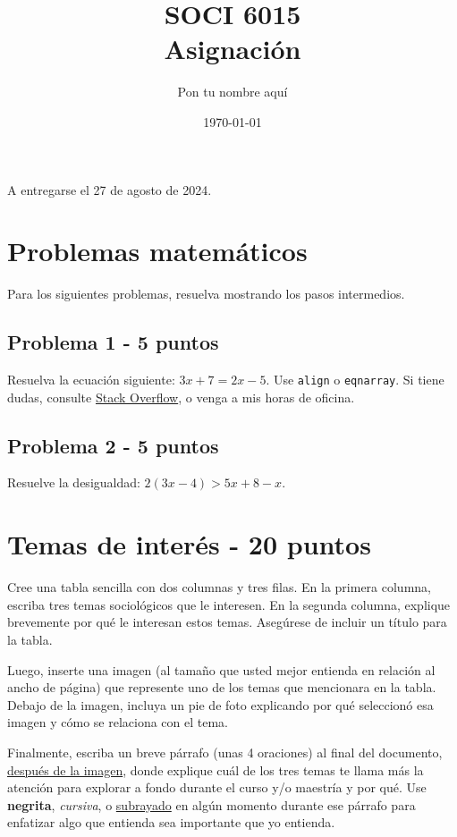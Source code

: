 \documentclass[11pt]{article} %
\title{SOCI 6015\\ Asignación \textnumero 1}
\author{Pon tu nombre aquí}
\date{\today}
\begin{document}
\maketitle
\begin{center}
   A entregarse el 27 de agosto de 2024. 
\end{center}


\section{Problemas matemáticos}

Para los siguientes problemas, resuelva mostrando los pasos intermedios.

\subsection{Problema 1 - 5 puntos} 

Resuelva la ecuación siguiente: $3x + 7 = 2x - 5$. Use \texttt{align} o \texttt{eqnarray}. Si tiene dudas, consulte \href{https://tex.stackexchange.com}{Stack Overflow}, o venga a mis horas de oficina.

\subsection{Problema 2 - 5 puntos} 

Resuelve la desigualdad: $2(3x - 4) > 5x + 8 - x$. 

\section{Temas de interés - 20 puntos}

Cree una tabla sencilla con dos columnas y tres filas. En la primera columna, escriba tres temas sociológicos que le interesen. En la segunda columna, explique brevemente por qué le interesan estos temas. Asegúrese de incluir un título para la tabla. 

Luego, inserte una imagen (al tamaño que usted mejor entienda en relación al ancho de página) que represente uno de los temas que mencionara en la tabla. Debajo de la imagen, incluya un pie de foto explicando por qué seleccionó esa imagen y cómo se relaciona con el tema. 

Finalmente, escriba un breve párrafo (unas 4 oraciones) al final del documento, \underline{después de la imagen}, donde explique cuál de los tres temas te llama más la atención para explorar a fondo durante el curso y/o maestría y por qué. Use \textbf{negrita}, \textit{cursiva}, o \underline{subrayado} en algún momento durante ese párrafo para enfatizar algo que entienda sea importante que yo entienda.
\end{document}
